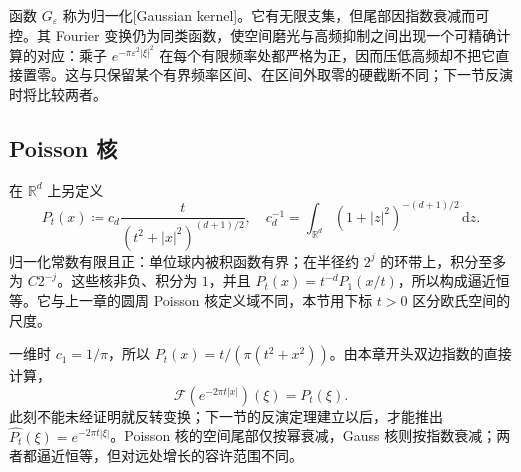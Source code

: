 函数 \(G_\varepsilon\) 称为归一化[Gaussian kernel]。它有无限支集，但尾部因指数衰减而可控。其 Fourier 变换仍为同类函数，使空间磨光与高频抑制之间出现一个可精确计算的对应：乘子 \(e^{-\pi\varepsilon^2|\xi|^2}\) 在每个有限频率处都严格为正，因而压低高频却不把它直接置零。这与只保留某个有界频率区间、在区间外取零的硬截断不同；下一节反演时将比较两者。

\subsection{Poisson 核}
\label{b2:subsec:030404}

在 \(\mathbb R^d\) 上另定义
\[
 P_t(x)\coloneqq c_d\dfrac{t}{(t^2+|x|^2)^{(d+1)/2}},
 \quad
 c_d^{-1}=\int_{\mathbb R^d}(1+|z|^2)^{-(d+1)/2}\,\mathrm{d}z.
\]
归一化常数有限且正：单位球内被积函数有界；在半径约 \(2^j\) 的环带上，积分至多为 \(C2^{-j}\)。这些核非负、积分为 \(1\)，并且 \(P_t(x)=t^{-d}P_1(x/t)\)，所以构成逼近恒等。它与上一章的圆周 Poisson 核定义域不同，本节用下标 \(t>0\) 区分欧氏空间的尺度。

\ProseParagraphBreak

一维时 \(c_1=1/\pi\)，所以 \(P_t(x)=t/(\pi(t^2+x^2))\)。由本章开头双边指数的直接计算，
\[
 \mathcal F(e^{-2\pi t|x|})(\xi)=P_t(\xi).
\]
此刻不能未经证明就反转变换；下一节的反演定理建立以后，才能推出 \(\widehat {P_t}(\xi)=e^{-2\pi t|\xi|}\)。Poisson 核的空间尾部仅按幂衰减，Gauss 核则按指数衰减；两者都逼近恒等，但对远处增长的容许范围不同。
